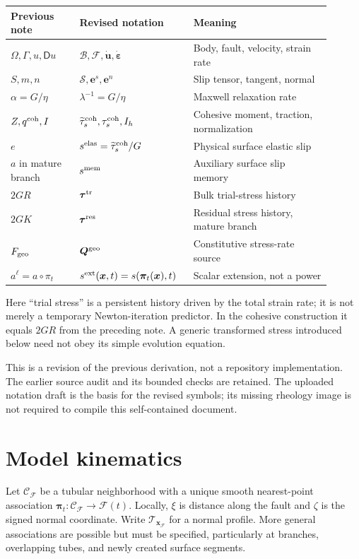 \documentclass[10pt,letterpaper]{article}
\newcommand{\B}{\mathcal B}
\newcommand{\F}{\mathcal F}
\newcommand{\SSS}{\bm{\mathcal S}}
\newcommand{\tat}{\bm\tau^{\rm tr}}
\newcommand{\tar}{\bm\tau^{\rm res}}
\newcommand{\Qgeo}{\bm Q^{\rm geo}}
\newcommand{\vel}{\dot{\bm u}}
\newcommand{\erate}{\dot{\bm\varepsilon}}
\newcommand{\sel}{s^{\rm elas}}
\newcommand{\smem}{s^{\rm mem}}
\newcommand{\Z}{\widetilde\tau_s^{\rm coh}}
\newcommand{\qcoh}{\tau_s^{\rm coh}}
\begin{document}
\begin{center}
\begin{tabular}{p{0.20\linewidth}p{0.30\linewidth}p{0.40\linewidth}}
\toprule
Previous note & Revised notation & Meaning\\
\midrule
$\Omega,\Gamma,u,\mathsf D u$ & $\B,\F,\vel,\erate$ & Body, fault, velocity, strain rate\\
$S,m,n$ & $\SSS,\bm e^s,\bm e^n$ & Slip tensor, tangent, normal\\
$\alpha=G/\eta$ & $\lambda^{-1}=G/\eta$ & Maxwell relaxation rate\\
$Z,q^{\rm coh},I$ & $\Z,\qcoh,I_h$ & Cohesive moment, traction, normalization\\
$e$ & $\sel=\Z/G$ & Physical surface elastic slip\\
$a$ in mature branch & $\smem$ & Auxiliary surface slip memory\\
$2GR$ & $\tat$ & Bulk trial-stress history\\
$2GK$ & $\tar$ & Residual stress history, mature branch\\
$F_{\rm geo}$ & $\Qgeo$ & Constitutive stress-rate source\\
$a^\ell=a\circ\pi_t$ & $s^{\rm ext}(\bm x,t)=s(\bm\pi_t(\bm x),t)$ & Scalar extension, not a power\\
\bottomrule
\end{tabular}
\end{center}
Here ``trial stress'' is a persistent history driven by the total strain rate; it is not merely a temporary Newton-iteration predictor. In the cohesive construction it equals $2GR$ from the preceding note. A generic transformed stress introduced below need not obey its simple evolution equation.

This is a revision of the previous derivation, not a repository implementation. The earlier source audit and its bounded checks are retained. The uploaded notation draft is the basis for the revised symbols; its missing rheology image is not required to compile this self-contained document.

\clearpage
\section{Model kinematics}
Let $\mathcal C_{\F}$ be a tubular neighborhood with a unique smooth nearest-point association $\bm\pi_t:\mathcal C_{\F}\to\F(t)$. Locally, $\xi$ is distance along the fault and $\zeta$ is the signed normal coordinate. Write $\mathcal T_{\bm x_{\F}}$ for a normal profile. More general associations are possible but must be specified, particularly at branches, overlapping tubes, and newly created surface segments.
\end{document}
